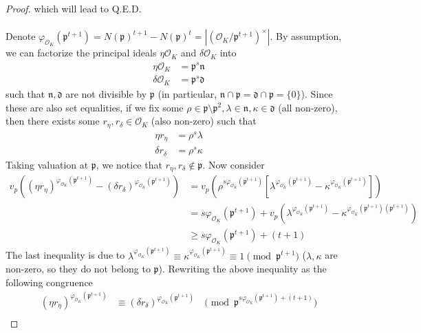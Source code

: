 \documentclass{treatise}
\begin{document}
\begin{proof}
which will lead to Q.E.D.
\\
\\
Denote $\varphi_{\mathcal{O}_K} (\mathfrak{p}^{t + 1}) = N(\mathfrak{p})^{t + 1} - N(\mathfrak{p})^t = |(\mathcal{O}_K / \mathfrak{p}^{t + 1})^\times|$. By assumption, we can factorize the principal ideals $\eta \mathcal{O}_K$ and $\delta \mathcal{O}_K$ into
\begin{align*}
\eta \mathcal{O}_K & = \mathfrak{p}^s \mathfrak{n} \\
\delta \mathcal{O}_K & = \mathfrak{p}^s \mathfrak{d}
\end{align*}
such that $\mathfrak{n}, \mathfrak{d}$ are not divisible by $\mathfrak{p}$ (in particular, $\mathfrak{n} \cap \mathfrak{p} = \mathfrak{d} \cap \mathfrak{p} = \{ 0 \}$). Since these are also set equalities, if we fix some $\rho \in \mathfrak{p} \setminus \mathfrak{p}^2, \lambda \in \mathfrak{n}, \kappa \in \mathfrak{d}$ (all non-zero), then there exists some $r_\eta, r_\delta \in \mathcal{O}_K$ (also non-zero) such that
\begin{align*}
\eta r_\eta & = \rho^s \lambda \\
\delta r_\delta & = \rho^s \kappa
\end{align*}
Taking valuation at $\mathfrak{p}$, we notice that $r_\eta, r_\delta \notin \mathfrak{p}$. Now consider
\begin{align*}
v_p \left( (\eta r_\eta)^{\varphi_{\mathcal{O}_K} (\mathfrak{p}^{t + 1})} - (\delta r_\delta)^{\varphi_{\mathcal{O}_K} (\mathfrak{p}^{t + 1})} \right) & = v_p \left( \rho^{s \varphi_{\mathcal{O}_K} (\mathfrak{p}^{t + 1})} \left[ \lambda^{\varphi_{\mathcal{O}_K} (\mathfrak{p}^{t + 1})} - \kappa^{\varphi_{\mathcal{O}_K} (\mathfrak{p}^{t + 1})} \right] \right) \\
& = s \varphi_{\mathcal{O}_K} (\mathfrak{p}^{t + 1}) + v_p \left( \lambda^{\varphi_{\mathcal{O}_K} (\mathfrak{p}^{t + 1})} - \kappa^{\varphi_{\mathcal{O}_K}(\mathfrak{p}^{t + 1}) (\mathfrak{p}^{t + 1})} \right) \\
& \geq s \varphi_{\mathcal{O}_K}(\mathfrak{p}^{t + 1}) + (t + 1)
\end{align*}
The last inequality is due to $\lambda^{\varphi_{\mathcal{O}_K} (\mathfrak{p}^{t + 1})} \equiv \kappa^{\varphi_{\mathcal{O}_K} (\mathfrak{p}^{t + 1})} \equiv 1 \pmod{\mathfrak{p}^{t + 1}}$ ($\lambda, \kappa$ are non-zero, so they do not belong to $\mathfrak{p}$). Rewriting the above inequality as the following congruence
\begin{align*}
(\eta r_\eta)^{\varphi_{\mathcal{O}_K} (\mathfrak{p}^{t + 1})} & \equiv (\delta r_\delta)^{\varphi_{\mathcal{O}_K} (\mathfrak{p}^{t + 1})} & \pmod{\mathfrak{p}^{s \varphi_{\mathcal{O}_K} (\mathfrak{p}^{t + 1}) + (t + 1)}} \\

\end{align*}
\end{proof}
\end{document}
